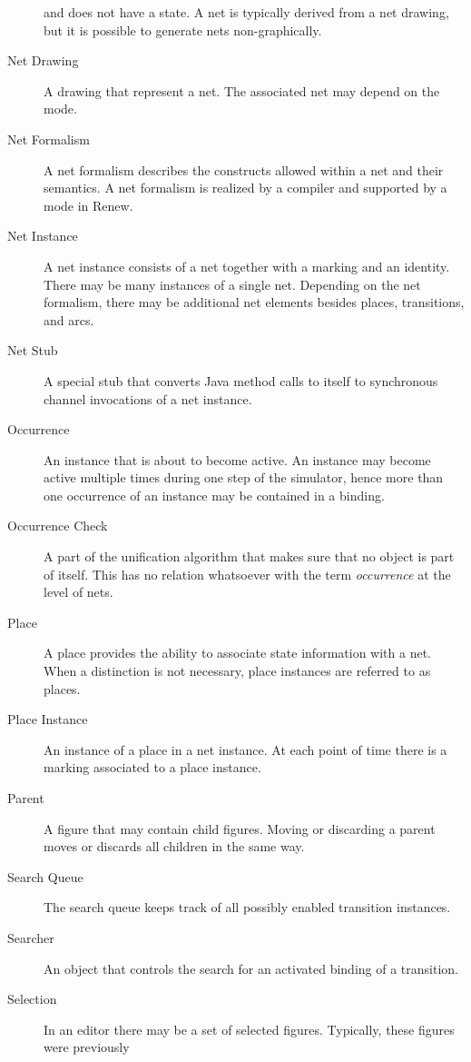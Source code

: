 \begin{description}
  and does not have a state. A net is typically derived from
  a \see net drawing, but it is possible to generate nets non-graphically.
\item[Net Drawing] A \see drawing that represent a \see net. The
  associated \see net may depend on the \see mode.
\item[Net Formalism] A net formalism describes the constructs allowed
  within a \see net and their semantics. A net formalism is realized
  by a \see compiler and supported by a \see mode in Renew.
\item[Net Instance] A net instance consists of a \see net together with a
  marking and an identity. There may be many instances of a
  single \see net. Depending on the \see net formalism, there may be
  additional \see net elements besides \see places, \see transitions,
  and \see arcs.
\item[Net Stub] A special \see stub that converts Java method calls
  to itself to synchronous channel invocations of a \see net instance.
\item[Occurrence] An \see instance that is about to become active.
  An instance may become active multiple times during one step of
  the simulator, hence more than one occurrence of an \see instance
  may be contained in a \see binding.
\item[Occurrence Check] A part of the unification algorithm that
  makes sure that no object is part of itself. This has no relation
  whatsoever with the term \emph{occurrence} at the level of nets.
\item[Place] A place provides the ability to associate state information
  with a net. When a distinction is not necessary,
  \see place instances are referred to as places.
\item[Place Instance] An instance of a \see place in a \see net instance.
  At each point of time there is a \see marking associated to a
  place instance.
\item[Parent] A figure that may contain \see child figures. Moving
  or discarding a parent moves or discards all \see children in the
  same way.
\item[Search Queue] The search queue keeps track of all possibly
  enabled \see transition instances.
\item[Searcher] An object that controls the search for an
  activated \see binding of a \see transition.
\item[Selection] In an \see editor there may be a set of
  selected \see figures. Typically, these figures were previously

\end{description}
